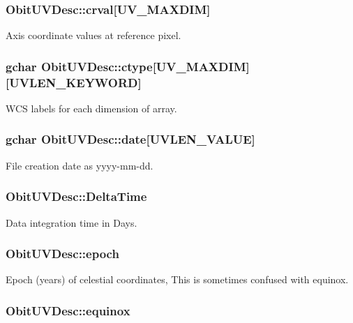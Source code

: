 \subsubsection{ {\bf Obit\-UVDesc::crval}[UV\_\-MAXDIM]}\label{structObitUVDesc_o36}


Axis coordinate values at reference pixel. 

\subsubsection{\setlength{\rightskip}{0pt plus 5cm}gchar {\bf Obit\-UVDesc::ctype}[UV\_\-MAXDIM][UVLEN\_\-KEYWORD]}\label{structObitUVDesc_o14}


WCS labels for each dimension of array. 

\subsubsection{\setlength{\rightskip}{0pt plus 5cm}gchar {\bf Obit\-UVDesc::date}[UVLEN\_\-VALUE]}\label{structObitUVDesc_o28}


File creation date as yyyy-mm-dd. 

\subsubsection{ {\bf Obit\-UVDesc::Delta\-Time}}\label{structObitUVDesc_o22}


Data integration time in Days. 

\subsubsection{ {\bf Obit\-UVDesc::epoch}}\label{structObitUVDesc_o31}


Epoch (years) of celestial coordinates, This is sometimes confused with equinox. 

\subsubsection{ {\bf Obit\-UVDesc::equinox}}\label{structObitUVDesc_o32}


